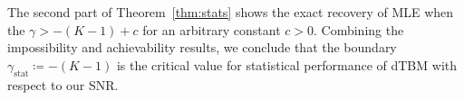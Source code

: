 \documentclass[lettersize,onecolumn,journal]{IEEEtran}
\theoremstyle{definition}
\newtheorem{thm}{Theorem}
\theoremstyle{definition}
\begin{document}
The second part of Theorem~\ref{thm:stats} shows the exact recovery of MLE when the $\gamma>-(K-1)+c$ for an arbitrary constant $c>0$. Combining the impossibility and achievability results, we conclude that the boundary $\gamma_{\text{stat}} \coloneqq -(K-1)$ is the critical value for statistical performance of dTBM with respect to our SNR.








\end{document}
